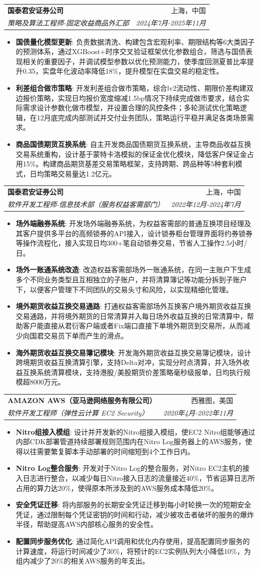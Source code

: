 \documentclass[a4paper,10pt]{article}
\makeatletter
\newcommand{\resumeItem}[2]{
  \item\small{
    \textbf{#1}{: #2 \vspace{-2pt}}
  }
}
\newcommand{\resumeSubheading}[4]{
  \vspace{-1pt}\item
    \begin{tabular*}{0.97\textwidth}[t]{l@{\extracolsep{\fill}}r}
      \textbf{#1} & #2 \\
      \textit{\small#3} & \textit{\small #4} \\
    \end{tabular*}\vspace{-5pt}
}
\newcommand{\resumeItemListStart}{\begin{itemize}}
\newcommand{\resumeItemListEnd}{\end{itemize}\vspace{-5pt}}
\makeatother
\begin{document}
\resumeSubheading
{国泰君安证券公司}{上海，中国}
{策略及算法工程师-固定收益商品外汇部}{2024年7月-2025年11月}
\resumeItemListStart
\resumeItem{国债量化模型更新}
{负责数据清洗、构建包含宏观利率、期限结构等6大类因子的预测体系，通过XGBoost+时序交叉验证框架优化参数组合，筛选与国债表现相关的重要因子，并调试模型参数以优化预测能力，使季度回测夏普比率提升0.35，实盘年化波动率降低18\%，提升模型在实盘交易的稳定性。}
\resumeItem{利差组合做市策略}
{开发利差组合做市策略，综合lv2流动性、期限价差构建双边报价策略，实现日均报价宽度缩减1.5bp情况下持续完成做市要求，结合实际需求设计参数化做市模型，并设置合理的风控条件；多轮测试优化策略逻辑，在12月底完成内部测试并交付业务团队，策略运行平稳并满足各类场景需求。}
\resumeItem{商品国债期货互换系统}
{自主开发商品国债期货互换系统，主导商品收益互换交易系统重构，设计基于蒙特卡洛模拟的保证金优化模块，降低客户保证金占用15\%。构建商品期货基差交易策略框架，支持跨期、跨品种等5种套利模式，日均策略交易量达1.2亿元。}
\resumeItemListEnd

\resumeSubheading
{国泰君安证券公司}{上海，中国}
{软件开发工程师-信息技术部（服务权益客需部门）}{2022年12月-2024年7月}
\resumeItemListStart
\resumeItem{场外端融券系统}
{开发场外端融券系统，为权益客需部的普通互换项目经理及其客户提供多平台的高频锁券的API接入，设计锁券柜台管理界面将约券锁券等操作流程化，接入实现日均300+笔自动锁券交易，节省人工操作2.5小时/日。}

\resumeItem{场外一账通系统改造}
{改造权益客需部场外一账通系统，在同一主账户下生成多个不同业务类型且互相独立的子账户，并将清算簿记等功能分拆到子账户下，以便客户管理下不同团队的交易头寸和风险，以实现精细化管理。}
\resumeItem{境外期货收益互换交易通路}
{打通权益客需部场外互换客户境外期货收益互换交易通路，并将境外期货的日常清算并入每日场外收益互换的日常清算中，帮助客户能直接从君衍客户端或者Fix端口直接下单境外期货到交易所，从而减少向国君交易员下单而产生的滑点。}
\resumeItem{海外期货收益互换交易簿记模块}
{开发海外期货收益互换交易簿记模块，设计跨境期货收益互换清算引擎，支持Delta对冲，实现分时点清算，并入场外收益互换系统清算模块，支持港股/美股期货价差策略毫秒级报单，日均执行规模超8000万元。}
\resumeItemListEnd

\resumeSubheading
{AMAZON AWS（亚马逊网络服务有限公司）}{西雅图，美国}
{软件开发工程师（弹性云计算 EC2 Security）}{2020年4月-2022年11月}
\resumeItemListStart
\resumeItem{Nitro组接入模组}
{设计并开发新的Nitro组接入模组，使EC2 Nitro组能够通过内部CDK部署管道持续部署规则范围内在Nitro Log服务器上的AWS服务，使得以往需要繁复脚本手动部署的时间缩短到4个工作日内。}
\resumeItem{Nitro Log整合服务}
{开发对于Nitro Log的整合服务，对Nitro EC2主机的接入日志进行整合，以减少每日Nitro接入日志的流量接近40\%，节省运算日志所占用的算力达20\%，使得原本所涉及到的AWS服务成本降低20\%。}
\resumeItem{安全凭证迁移}
{将内部服务的长期安全凭证迁移到每小时轮换一次的短期安全凭证，通过限制每个凭证密钥的时间和行动，减少被攻击者破坏的服务的爆炸半径，帮助提高AWS内部核心服务的安全性。}
\resumeItem{配置同步服务优化}
{通过简化API调用和优化内存使用，提高配置同步服务的计算速度，将运行时间减少了30\%，将预计的EC2实例队列大小降低10\%，为组内减少了20\%的相关AWS服务的年支出。}
\resumeItemListEnd
\end{document}
